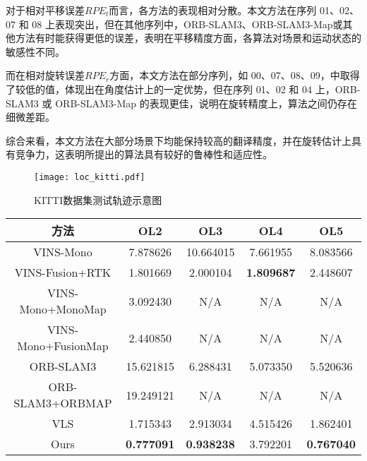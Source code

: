 对于相对平移误差$RPE_t$而言，各方法的表现相对分散。本文方法在序列 01、02、07 和 08 上表现突出，但在其他序列中，ORB-SLAM3、ORB-SLAM3-Map或其他方法有时能获得更低的误差，表明在平移精度方面，各算法对场景和运动状态的敏感性不同。

而在相对旋转误差$RPE_r$方面，本文方法在部分序列，如 00、07、08、09，中取得了较低的值，体现出在角度估计上的一定优势，但在序列 01、02 和 04 上，ORB-SLAM3 或 ORB-SLAM3-Map 的表现更佳，说明在旋转精度上，算法之间仍存在细微差距。

综合来看，本文方法在大部分场景下均能保持较高的翻译精度，并在旋转估计上具有竞争力，这表明所提出的算法具有较好的鲁棒性和适应性。

\begin{figure}
  \centering
  \texttt{[image: loc\_kitti.pdf]}
  \caption{KITTI数据集测试轨迹示意图}
  \label{fig:loc_kitti}
\end{figure}


\begin{table}
\centering
\begin{tabular}{ccccc}
\toprule
\textbf{方法}           & \textbf{OL2}      & \textbf{OL3}      & \textbf{OL4}      & \textbf{OL5}      \\ \midrule
VINS-Mono           & 7.878626          & 10.664015         & 7.661955          & 8.083566          \\
VINS-Fusion+RTK     & 1.801669          & 2.000104          & \cellcolor[HTML]{FA7F6F}\textbf{1.809687}          & 2.448607          \\
VINS-Mono+MonoMap   & 3.092430          & N/A               & N/A               & N/A               \\
VINS-Mono+FusionMap & 2.440850          & N/A               & N/A               & N/A               \\
ORB-SLAM3           & 15.621815         & 6.288431          & 5.073350          & 5.520636          \\
ORB-SLAM3+ORBMAP    & 19.249121         & N/A               & N/A               & N/A               \\
VLS                 & 1.715343          & 2.913034          & 4.515426          & 1.862401          \\
Ours                & \cellcolor[HTML]{FA7F6F}\textbf{0.777091} & \cellcolor[HTML]{FA7F6F}\textbf{0.938238} & 3.792201 & \cellcolor[HTML]{FA7F6F}\textbf{0.767040} \\ \bottomrule
\end{tabular}
\end{table}


